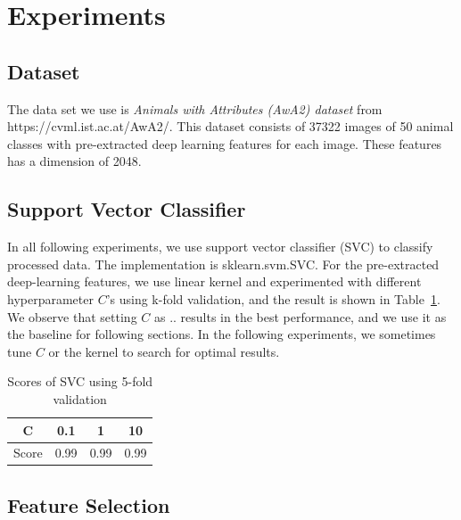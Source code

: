 \documentclass[journal]{IEEEtran}
\begin{document}
\section{Experiments}
\label{sec:3}
\subsection{Dataset}
The data set we use is \emph{Animals with Attributes (AwA2) dataset} from https://cvml.ist.ac.at/AwA2/. This dataset consists of 37322
images of 50 animal classes with pre-extracted deep learning features for each image. These features has a dimension of 2048.
\subsection{Support Vector Classifier}
In all following experiments, we use support vector classifier (SVC) to classify processed data. The implementation is sklearn.svm.SVC. For the pre-extracted deep-learning features, we use linear kernel and experimented with different hyperparameter $C$'s using k-fold validation, and the result is shown in Table~\ref{tab:1}. We observe that setting $C$ as .. results in the best performance, and we use it as the baseline for following sections. In the following experiments, we sometimes tune $C$ or the kernel to search for optimal results. 
\begin{table}[htbp]
\centering
\caption{Scores of SVC using 5-fold validation}
\label{tab:1}
\begin{tabular}{cccc}
\toprule
C&0.1&1&10 \\  %
\midrule
Score&0.99&0.99&0.99\\ 
\bottomrule
\end{tabular}
\end{table}
\subsection{Feature Selection}
\end{document}
